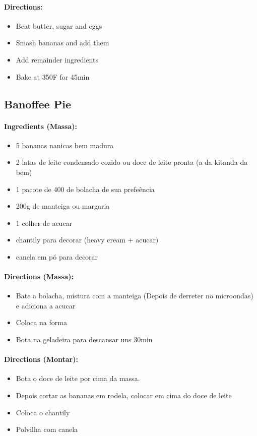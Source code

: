 \documentclass{article}
\begin{document}
\paragraph{Directions:}
\begin{itemize}
    \item Beat butter, sugar and eggs
    \item Smash bananas and add them
    \item Add remainder ingredients
    \item Bake at 350F for 45min
\end{itemize}

\subsection{Banoffee Pie} 

\paragraph{Ingredients (Massa):}
\begin{itemize}
    \item 5 bananas nanicas bem madura
    \item 2 latas de leite condensado cozido ou doce de leite pronta (a da kitanda da bem)
    \item 1 pacote de 400 de bolacha de sua prefeência
    \item 200g de manteiga ou margaria
    \item 1 colher de acucar
    \item chantily para decorar (heavy cream + acucar)
    \item canela em pó para decorar
\end{itemize}  

\paragraph{Directions (Massa):}
\begin{itemize}
    \item Bate a bolacha, mistura com a manteiga (Depois de derreter no microondas) e adiciona a acucar
    \item Coloca na forma
    \item Bota na geladeira para descansar uns 30min
\end{itemize}  

\paragraph{Directions (Montar):}
\begin{itemize}
    \item Bota o doce de leite por cima da massa.
    \item Depois cortar as bananas em rodela, colocar em cima do doce de leite
    \item Coloca o chantily
    \item Polvilha com canela
\end{itemize} 
\end{document}
